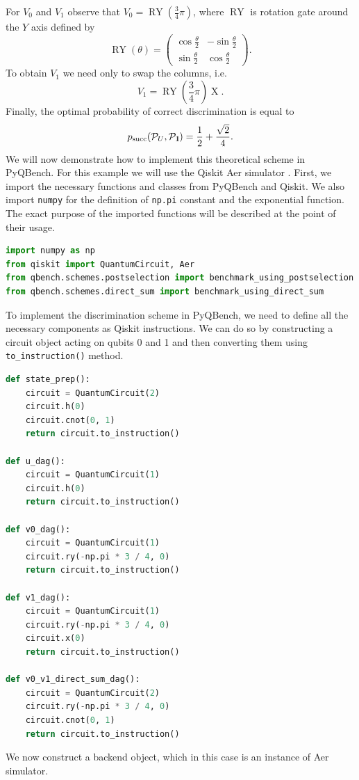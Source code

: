 \documentclass[preprint,12pt, a4paper, dvipsnames]{elsarticle}
\newcommand{\1}{{\rm 1\hspace{-0.9mm}l}}
\newcommand{\Id}{{\rm 1\hspace{-0.9mm}l}}
\newcommand{\PP}{\mathcal{P}}
\theoremstyle{definition}
\begin{document}
For $V_0$ and $V_1$ observe that $V_0 = \operatorname{RY}\left(\frac{3}{4} \pi \right) $, where $\operatorname{RY}$ is rotation gate around the $Y$ axis defined by
\begin{equation}
\operatorname{RY}(\theta) =
\left(\begin{array}{cc} \cos\frac{\theta}{2} & -\sin\frac{\theta}{2} \\ \sin\frac{\theta}{2} & \cos\frac{\theta}{2} \end{array}\right).
\end{equation}
To obtain $V_1$  we need only to swap the columns, i.e.
\begin{equation}
V_1 = \operatorname{RY}\left(\frac{3}{4} \pi \right) \operatorname{X}.
\end{equation}
Finally, the optimal probability of correct discrimination is equal to
\begin{equation}
p_{\text{succ}}(\PP_{U}, \PP_{\Id}) = \frac{1}{2} + \frac{\sqrt{2}}{4}.
\end{equation}
We will now demonstrate how to implement this theoretical scheme in PyQBench. For this example we
will use the Qiskit Aer simulator \cite{aer}. First, we import the necessary functions and classes from
PyQBench and Qiskit. We also import \texttt{numpy} for the definition of \texttt{np.pi} constant and
the exponential function. The exact purpose of the imported functions will be described at the point
of their usage.
\begin{lstlisting}[language=Python, caption=Imports needed for running benchmarking example]
import numpy as np
from qiskit import QuantumCircuit, Aer
from qbench.schemes.postselection import benchmark_using_postselection
from qbench.schemes.direct_sum import benchmark_using_direct_sum
\end{lstlisting}
To implement the discrimination scheme in PyQBench, we need to define all the necessary components
as Qiskit instructions. We can do so by constructing a circuit object acting on qubits 0 and 1 and
then converting them using \texttt{to\_instruction()} method.
\begin{lstlisting}[language=Python, caption= Defining components for Hadamard experiment]
def state_prep():
	circuit = QuantumCircuit(2)
	circuit.h(0)
	circuit.cnot(0, 1)
	return circuit.to_instruction()

def u_dag():
	circuit = QuantumCircuit(1)
	circuit.h(0)
	return circuit.to_instruction()

def v0_dag():
	circuit = QuantumCircuit(1)
	circuit.ry(-np.pi * 3 / 4, 0)
	return circuit.to_instruction()

def v1_dag():
	circuit = QuantumCircuit(1)
	circuit.ry(-np.pi * 3 / 4, 0)
	circuit.x(0)
	return circuit.to_instruction()

def v0_v1_direct_sum_dag():
	circuit = QuantumCircuit(2)
	circuit.ry(-np.pi * 3 / 4, 0)
	circuit.cnot(0, 1)
	return circuit.to_instruction()
\end{lstlisting}
We now construct a backend object, which in this case is an instance of Aer simulator.
\end{document}
